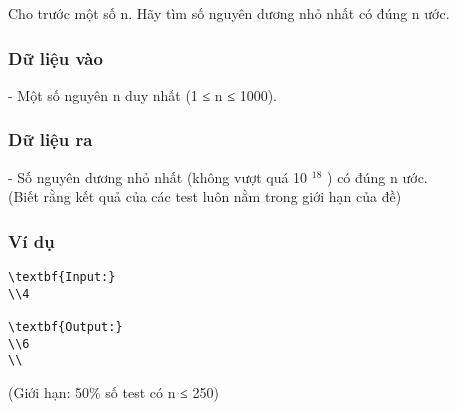 



   Cho trước một số n. Hãy tìm số nguyên dương nhỏ nhất có đúng n ước.  

\subsubsection{   Dữ liệu vào  }

   - Một số nguyên n duy nhất (1 ≤ n ≤ 1000).  

\subsubsection{   Dữ liệu ra  }

   - Số nguyên dương nhỏ nhất (không vượt quá 10   $^    18   $   ) có đúng n ước.   
\\   (Biết rằng kết quả của các test luôn nằm trong giới hạn của đề)  

\subsubsection{   Ví dụ  }


\begin{verbatim}
\textbf{Input:}
\\4

\textbf{Output:}
\\6
\\\end{verbatim}

   (Giới hạn: 50\% số test có n ≤ 250)  